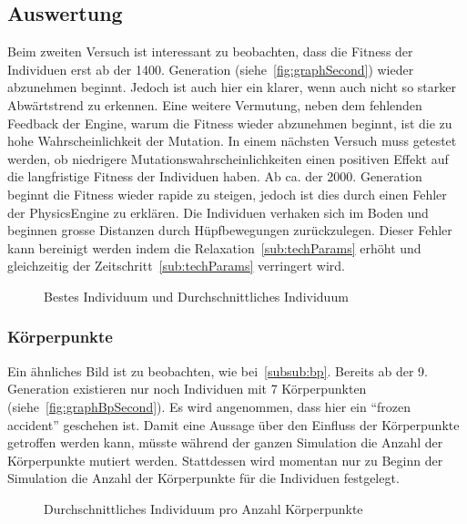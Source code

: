     \subsection{Auswertung\label{sub:scndAuswertung}}

      Beim zweiten Versuch ist interessant zu beobachten,
      dass die Fitness der Individuen erst ab der 1400\@. Generation (siehe~\vref{fig:graphSecond})
      wieder abzunehmen beginnt.
      Jedoch ist auch hier ein klarer, wenn auch nicht so starker Abwärtstrend zu erkennen.
      Eine weitere Vermutung, neben dem fehlenden Feedback der Engine, warum die Fitness wieder abzunehmen beginnt,
      ist die zu hohe Wahrscheinlichkeit der Mutation.
      In einem nächsten Versuch muss getestet werden,
      ob niedrigere Mutationswahrscheinlichkeiten einen positiven Effekt auf die langfristige Fitness der Individuen haben.
      Ab ca\@. der 2000\@. Generation beginnt die Fitness wieder rapide zu steigen,
      jedoch ist dies durch einen Fehler der \gls{PhysicsEngine} zu erklären.
      Die Individuen verhaken sich im Boden und beginnen grosse Distanzen durch Hüpfbewegungen zurückzulegen.
      Dieser Fehler kann bereinigt werden indem die Relaxation~\vref{sub:techParams} erhöht und gleichzeitig der Zeitschritt~\vref{sub:techParams} verringert wird.

      \begin{figure}[H]
        \centering
        
        \caption{Bestes Individuum und Durchschnittliches Individuum\label{fig:graphSecond}}
      \end{figure}

      \subsubsection{Körperpunkte\label{subsub:bpScnd}}

        Ein ähnliches Bild ist zu beobachten, wie bei~\vref{subsub:bp}.
        Bereits ab der 9\@. Generation existieren nur noch Individuen mit 7 Körperpunkten (siehe~\vref{fig:graphBpSecond}).
        Es wird angenommen, dass hier ein ``frozen accident'' geschehen ist.
        Damit eine Aussage über den Einfluss der Körperpunkte getroffen werden kann,
        müsste während der ganzen Simulation die Anzahl der Körperpunkte mutiert werden.
        Stattdessen wird momentan nur zu Beginn der Simulation die Anzahl der Körperpunkte für die Individuen festgelegt.

        \begin{figure}[H]
          \centering
          
          \caption{Durchschnittliches Individuum pro Anzahl Körperpunkte\label{fig:graphBpSecond}}
        \end{figure}

